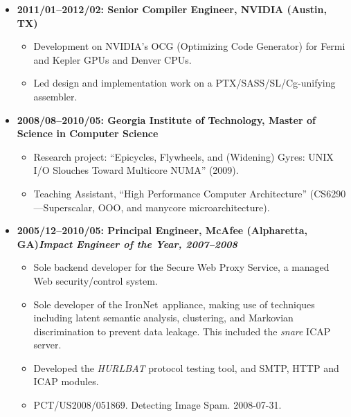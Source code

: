 \documentclass{article}
\newenvironment{tightitemize}
{\begin{itemize}
  \setlength{\itemsep}{1pt}
  \setlength{\parskip}{0pt}
  \setlength{\parsep}{0pt}}
{\end{itemize}}
\begin{document}
\begin{tightitemize}
\item \textbf{2011/01--2012/02: Senior Compiler Engineer, NVIDIA (Austin, TX)}
\begin{tightitemize}
\item Development on NVIDIA's OCG (Optimizing Code Generator) for Fermi and Kepler GPUs and Denver CPUs.
\item Led design and implementation work on a PTX/SASS/SL/Cg-unifying assembler.
\end{tightitemize}

\item \textbf{2008/08--2010/05: Georgia Institute of Technology, Master of Science in Computer Science}
\begin{tightitemize}
\item Research project: ``Epicycles, Flywheels, and (Widening) Gyres: UNIX I/O
  Slouches Toward Multicore NUMA'' (2009).
\item Teaching Assistant, ``High Performance Computer Architecture'' (CS6290---Superscalar, OOO, and manycore microarchitecture).
\end{tightitemize}

\item \textbf{2005/12--2010/05: Principal Engineer, McAfee (Alpharetta, GA)\hfill \tiny{\textit{Impact Engineer of the Year, 2007--2008}}}
\begin{tightitemize}
\item Sole backend developer for the Secure Web Proxy Service, a managed Web
  security/control system.
\item Sole developer of the IronNet\texttrademark\ appliance, making use of techniques
  including latent semantic analysis, clustering, and Markovian discrimination
  to prevent data leakage. This included the \textit{snare} ICAP server.
\item Developed the \textit{HURLBAT} protocol testing tool, and SMTP, HTTP and ICAP modules.
\item PCT/US2008/051869. Detecting Image Spam. 2008-07-31.\hfill{}\\
\end{tightitemize}

\pagebreak


\end{tightitemize}
\end{document}
